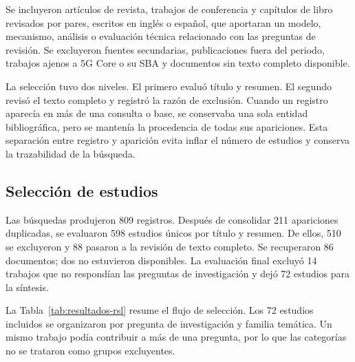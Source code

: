 Se incluyeron artículos de revista, trabajos de conferencia y capítulos de libro revisados por pares, escritos en inglés o español, que aportaran un modelo, mecanismo, análisis o evaluación técnica relacionado con las preguntas de revisión. Se excluyeron fuentes secundarias, publicaciones fuera del periodo, trabajos ajenos a 5G Core o su SBA y documentos sin texto completo disponible.

La selección tuvo dos niveles. El primero evaluó título y resumen. El segundo revisó el texto completo y registró la razón de exclusión. Cuando un registro aparecía en más de una consulta o base, se conservaba una sola entidad bibliográfica, pero se mantenía la procedencia de todas sus apariciones. Esta separación entre registro y aparición evita inflar el número de estudios y conserva la trazabilidad de la búsqueda.

\subsection{Selección de estudios}
\label{subsec:resultados-rsl}

Las búsquedas produjeron 809 registros. Después de consolidar 211 apariciones duplicadas, se evaluaron 598 estudios únicos por título y resumen. De ellos, 510 se excluyeron y 88 pasaron a la revisión de texto completo. Se recuperaron 86 documentos; dos no estuvieron disponibles. La evaluación final excluyó 14 trabajos que no respondían las preguntas de investigación y dejó 72 estudios para la síntesis.


La Tabla~\ref{tab:resultados-rsl} resume el flujo de selección. Los 72 estudios incluidos se organizaron por pregunta de investigación y familia temática. Un mismo trabajo podía contribuir a más de una pregunta, por lo que las categorías no se trataron como grupos excluyentes.


